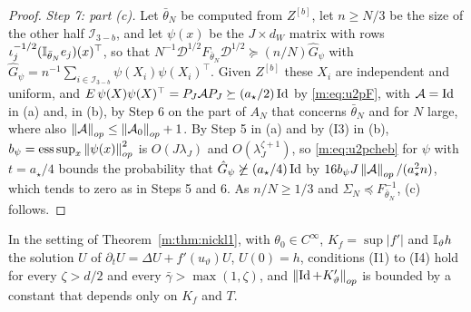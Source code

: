 \begin{proof}
\emph{Step 7: part (c).} Let $\bar\theta_N$ be computed from $Z^{[b]}$, let $n\ge N/3$ be the size of the other half $\mathcal I_{3-b}$, and let $\psi(x)$ be the $J\times d_W$ matrix with rows $\iota_j^{-1/2}(\mathbb{I}_{\bar\theta_N}e_j)(x)^\top$, so that $N^{-1}\mathcal D^{1/2}F_{\bar\theta_N}\mathcal D^{1/2}\succeq(n/N)\hat G_\psi$ with $\hat G_\psi=n^{-1}\sum_{i\in\mathcal I_{3-b}}\psi(X_i)\psi(X_i)^\top$. Given $Z^{[b]}$ these $X_i$ are independent and uniform, and $E\,\psi(X)\psi(X)^\top=P_J\mathcal AP_J\succeq(a_\star/2)\operatorname{Id}$ by \eqref{m:eq:u2pF}, with $\mathcal A=\operatorname{Id}$ in (a) and, in (b), by Step 6 on the part of $A_N$ that concerns $\bar\theta_N$ and for $N$ large, where also $\left\|\mathcal A\right\|_{op}\le\left\|\mathcal A_0\right\|_{op}+1$. By Step 5 in (a) and by (I3) in (b), $b_\psi=\mathrm{ess\,sup}_x\left\|\psi(x)\right\|^2_{op}$ is $O(J\lambda_J)$ and $O(\lambda_J^{\zeta+1})$, so \eqref{m:eq:u2pcheb} for $\psi$ with $t=a_\star/4$ bounds the probability that $\hat G_\psi\not\succeq(a_\star/4)\operatorname{Id}$ by $16b_\psi J\left\|\mathcal A\right\|_{op}/(a_\star^2n)$, which tends to zero as in Steps 5 and 6. As $n/N\ge1/3$ and $\Sigma_N\preceq F_{\bar\theta_N}^{-1}$, (c) follows.
\end{proof}

\begin{lemma}\label{m:lem:rdlin}
In the setting of Theorem~\ref{m:thm:nickl1}, with $\theta_0\in C^\infty$, $K_f=\sup|f'|$ and $\mathbb{I}_\vartheta h$ the solution $U$ of $\partial_tU=\Delta U+f'(u_\vartheta)U$, $U(0)=h$, conditions (I1) to (I4) hold for every $\zeta>d/2$ and every $\bar\gamma>\max(1,\zeta)$, and $\left\|\operatorname{Id}+K'_\vartheta\right\|_{op}$ is bounded by a constant that depends only on $K_f$ and $T$.
\end{lemma}

